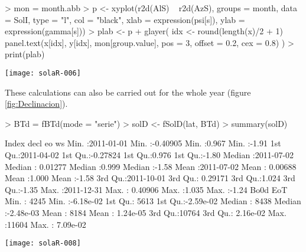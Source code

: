 \documentclass[oldfontcommands,a4paper]{memoir}
\makeatletter
\renewenvironment{figure}[1][]{%
     	\@float{figure}%
		\precaption{\rule{\linewidth}{0.4pt}\par}%
		\centering
		  }{%
    	\end@float	
}
\renewenvironment{Schunk}{\vspace{\topsep}}{\vspace{\topsep}}
\makeatother
\begin{document}
%

\begin{figure}
\begin{centering}
\begin{Schunk}
\begin{Sinput}
> mon = month.abb
> p <- xyplot(r2d(AlS) ~ r2d(AzS), groups = month, data = SolI, 
     type = "l", col = "black", xlab = expression(psi[s]), ylab = expression(gamma[s]))
> plab <- p + glayer({
     idx <- round(length(x)/2 + 1)
     panel.text(x[idx], y[idx], mon[group.value], pos = 3, offset = 0.2, 
         cex = 0.8)
 })
> print(plab)
\end{Sinput}
\end{Schunk}
\texttt{[image: solaR-006]}

\par\end{centering}
\caption{\label{fig:AzimutAltura}Azimuth and height solar angles during the ``average days''.}
\end{figure}


These calculations can also be carried out for the whole year (figure \ref{fig:Declinacion}).

\begin{Schunk}
\begin{Sinput}
> BTd = fBTd(mode = "serie")
> solD <- fSolD(lat, BTd)
> summary(solD)
\end{Sinput}
\begin{Soutput}
     Index                 decl                eo              ws       
 Min.   :2011-01-01   Min.   :-0.40905   Min.   :0.967   Min.   :-1.91  
 1st Qu.:2011-04-02   1st Qu.:-0.27824   1st Qu.:0.976   1st Qu.:-1.80  
 Median :2011-07-02   Median : 0.01277   Median :0.999   Median :-1.58  
 Mean   :2011-07-02   Mean   : 0.00688   Mean   :1.000   Mean   :-1.58  
 3rd Qu.:2011-10-01   3rd Qu.: 0.29171   3rd Qu.:1.024   3rd Qu.:-1.35  
 Max.   :2011-12-31   Max.   : 0.40906   Max.   :1.035   Max.   :-1.24  
      Bo0d            EoT           
 Min.   : 4245   Min.   :-6.18e-02  
 1st Qu.: 5613   1st Qu.:-2.59e-02  
 Median : 8438   Median :-2.48e-03  
 Mean   : 8184   Mean   : 1.24e-05  
 3rd Qu.:10764   3rd Qu.: 2.16e-02  
 Max.   :11604   Max.   : 7.09e-02  
\end{Soutput}
\end{Schunk}


%
\begin{figure}
\begin{centering}
\begin{Schunk}
\end{Schunk}
\texttt{[image: solaR-008]}
\par\end{centering}

\caption{Declination throughout the year\label{fig:Declinacion}}

\end{figure}
\end{document}

